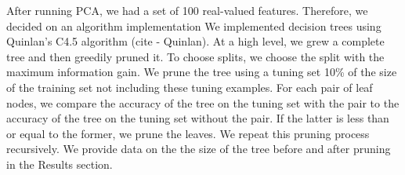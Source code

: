 After running PCA, we had a set of 100 real-valued features. 
Therefore, we decided on an algorithm implementation
We implemented decision trees using Quinlan's C4.5 algorithm (cite - Quinlan).
At a high level, we grew a complete tree and then greedily pruned it.
To choose splits, we choose the split with the maximum information gain.
We prune the tree using a tuning set 10\% of the size of the training set not including these tuning examples.
For each pair of leaf nodes, we compare the accuracy of the tree on the tuning set with the pair to the accuracy of the tree on the tuning set without the pair.
If the latter is less than or equal to the former, we prune the leaves.
We repeat this pruning process recursively.
We provide data on the the size of the tree before and after pruning in the Results section.

